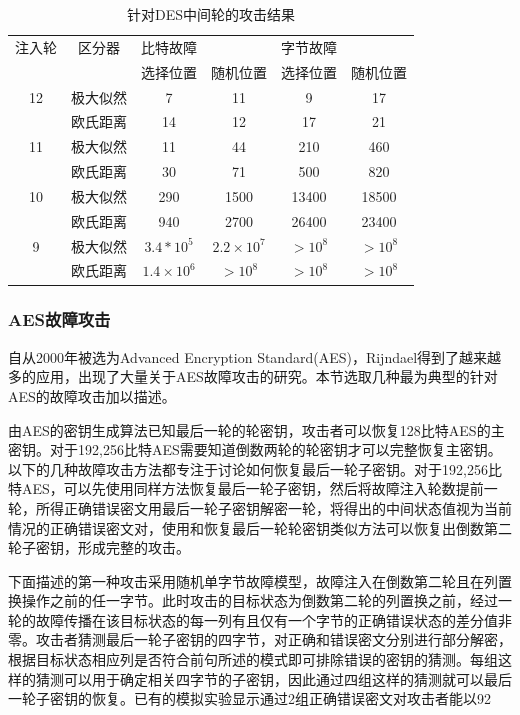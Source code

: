 \documentclass[a4paper,12pt]{article}
\begin{document}
\begin{CJK}{UTF8}{gkai}
\begin{table}
\centering
\begin{tabular}{*{6}{c}}
注入轮 & 区分器 & 比特故障 &  & 字节故障  &   \\
\cline{3-3} \cline{5-5}
 & & 选择位置 & 随机位置 & 选择位置  & 随机位置  \\
\hline
12 & 极大似然 & 7 & 11 & 9 & 17 \\
   & 欧氏距离 & 14 & 12 & 17 & 21 \\
11 & 极大似然 & 11 & 44 & 210 & 460 \\
   & 欧氏距离 & 30 & 71 & 500 & 820 \\
10 & 极大似然 & 290 & 1500 & 13400 & 18500 \\
   & 欧氏距离 & 940 & 2700 & 26400 & 23400 \\
9  & 极大似然 & $3.4*10^5$ & $2.2 \times 10^7$ & $>10^8$ & $>10^8$ \\
   & 欧氏距离 & $1.4 \times 10^6$ & $>10^8$ & $>10^8$ & $>10^8$ \\
\end{tabular}
\caption{针对DES中间轮的攻击结果}
\label{tab:3_1}
\end{table}

\subsubsection{AES故障攻击}

自从2000年被选为Advanced Encryption Standard(AES)，Rijndael得到了越来越多的应用，出现了大量关于AES故障攻击的研究。本节选取几种最为典型的针对AES的故障攻击加以描述。

由AES的密钥生成算法已知最后一轮的轮密钥，攻击者可以恢复128比特AES的主密钥。对于192,256比特AES需要知道倒数两轮的轮密钥才可以完整恢复主密钥。以下的几种故障攻击方法都专注于讨论如何恢复最后一轮子密钥。对于192,256比特AES，可以先使用同样方法恢复最后一轮子密钥，然后将故障注入轮数提前一轮，所得正确错误密文用最后一轮子密钥解密一轮，将得出的中间状态值视为当前情况的正确错误密文对，使用和恢复最后一轮轮密钥类似方法可以恢复出倒数第二轮子密钥，形成完整的攻击。

下面描述的第一种攻击采用随机单字节故障模型，故障注入在倒数第二轮且在列置换操作之前的任一字节。此时攻击的目标状态为倒数第二轮的列置换之前，经过一轮的故障传播在该目标状态的每一列有且仅有一个字节的正确错误状态的差分值非零。攻击者猜测最后一轮子密钥的四字节，对正确和错误密文分别进行部分解密，根据目标状态相应列是否符合前句所述的模式即可排除错误的密钥的猜测。每组这样的猜测可以用于确定相关四字节的子密钥，因此通过四组这样的猜测就可以最后一轮子密钥的恢复。已有的模拟实验显示通过2组正确错误密文对攻击者能以92%


\end{CJK}
\end{document}
